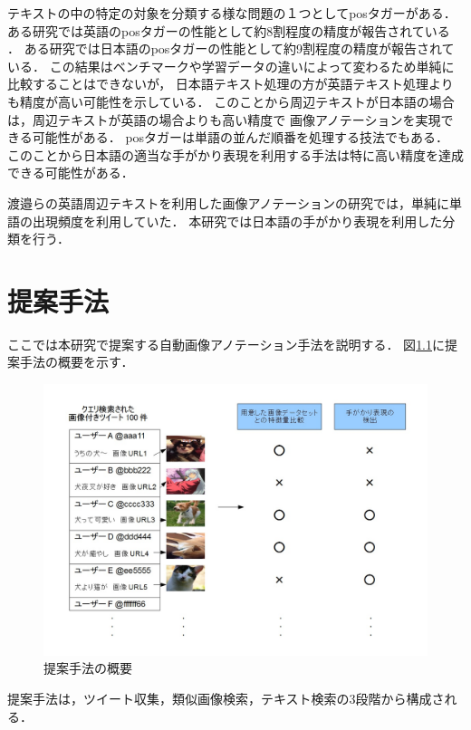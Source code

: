 テキストの中の特定の対象を分類する様な問題の１つとしてposタガーがある．
ある研究では英語のposタガーの性能として約8割程度の精度が報告されている\cite{BirdKleinLoper09}
．
ある研究では日本語のposタガーの性能として約9割程度の精度が報告されている\cite{UniDicJp2010}．
この結果はベンチマークや学習データの違いによって変わるため単純に比較することはできないが，
日本語テキスト処理の方が英語テキスト処理よりも精度が高い可能性を示している．
このことから周辺テキストが日本語の場合は，周辺テキストが英語の場合よりも高い精度で
画像アノテーションを実現できる可能性がある．
posタガーは単語の並んだ順番を処理する技法でもある．
このことから日本語の適当な手がかり表現を利用する手法は特に高い精度を達成できる可能性がある．

渡邉ら\cite{watanabe}の英語周辺テキストを利用した画像アノテーションの研究では，単純に単語の出現頻度を利用していた．
本研究では日本語の手がかり表現を利用した分類を行う．



\chapter{提案手法}
\label{sec:way}

ここでは本研究で提案する自動画像アノテーション手法を説明する．
図\ref{fig:way}に提案手法の概要を示す．
%
\begin{figure}[tb]
 \begin{center}
  \includegraphics[scale=0.50]{way.jpg}
 \end{center}
 \caption{提案手法の概要}
 \label{fig:way}
\end{figure}
%
提案手法は，ツイート収集，類似画像検索，テキスト検索の3段階から構成される．



